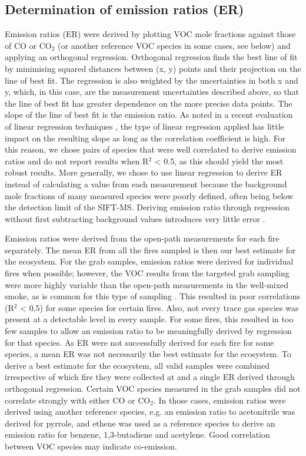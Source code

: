 \documentclass[acp, manuscript]{copernicus}
\begin{document}
\subsection{Determination of emission ratios (ER)} \label{sec:ER_calc}
Emission ratios (ER) were derived by plotting VOC mole fractions against those of CO or CO$_2$ (or another reference VOC species in some cases, see below) and applying an orthogonal regression. Orthogonal regression finds the best line of fit by minimising squared distances between (x, y) points and their projection on the line of best fit. The regression is also weighted by the uncertainties in both x and y, which, in this case, are the measurement uncertainties described above, so that the line of best fit has greater dependence on the more precise data points. The slope of the line of best fit is the emission ratio. As noted in a recent evaluation of linear regression techniques \citep{Wu2017}, the type of linear regression applied has little impact on the resulting slope as long as the correlation coefficient is high. For this reason, we chose pairs of species that were well correlated to derive emission ratios and do not report results when R$^2$ < 0.5, as this should yield the most robust results. More generally, we chose to use linear regression to derive ER instead of calculating a value from each measurement \citep[e.g.][]{Burling2011} because the background mole fractions of many measured species were poorly defined, often being below the detection limit of the SIFT-MS. Deriving emission ratio through regression without first subtracting background values introduces very little error \citep[< $0.1 \%$,][]{Wooster2011}.

Emission ratios were derived from the open-path measurements for each fire separately. The mean ER from all the fires sampled is then our best estimate for the ecosystem. For the grab samples, emission ratios were derived for individual fires when possible; however, the VOC results from the targeted grab sampling were more highly variable than the open-path measurements in the well-mixed smoke, as is common for this type of sampling \citep{Yokelson2008,Yokelson2013,Burling2011,Akagi2013}. This resulted in poor correlations (R$^2$ < 0.5) for some species for certain fires. Also, not every trace gas species was present at a detectable level in every sample. For some fires, this resulted in too few samples to allow an emission ratio to be meaningfully derived by regression for that species. As ER were not successfully derived for each fire for some species, a mean ER was not necessarily the best estimate for the ecosystem. To derive a best estimate for the ecosystem, all valid samples were combined irrespective of which fire they were collected at and a single ER derived through orthogonal regression. 
Certain VOC species measured in the grab samples did not correlate strongly with either CO or CO$_2$. In those cases, emission ratios were derived using another reference species, e.g. an emission ratio to acetonitrile was derived for pyrrole, and ethene was used as a reference species to derive an emission ratio for benzene, 1,3-butadiene and acetylene. Good correlation between VOC species may indicate co-emission. 
\end{document}
